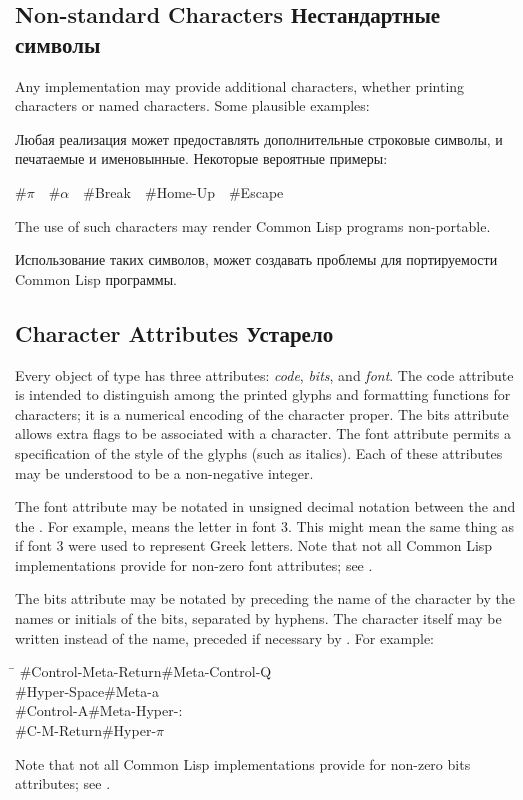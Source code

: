 \subsection{Non-standard Characters Нестандартные символы}

Any implementation may provide additional characters, whether printing
characters or named characters.  Some plausible examples:

Любая реализация может предоставлять дополнительные строковые символы, и
печатаемые и именовынные. Некоторые вероятные примеры:

\newpage%

\begin{lisp}
\#{\Xbackslash}$\pi$~~\#{\Xbackslash}$\alpha$~~\#{\Xbackslash}Break~~\#{\Xbackslash}Home-Up~~\#{\Xbackslash}Escape
\end{lisp}
The use of such characters may render Common Lisp programs non-portable.

Использование таких символов, может создавать проблемы для портируемости Common
Lisp программы.

\begin{obsolete}
\subsection{Character Attributes Устарело}
Every object of type 
has three attributes: \emph{code}, \emph{bits}, and \emph{font}.
The code attribute is intended to distinguish among the printed glyphs
and formatting functions for characters; it is a numerical encoding
of the character proper.
The bits attribute allows extra
flags to be associated with a character.  The font attribute permits
a specification of the style of the glyphs (such as italics).
Each of these attributes may be understood to be a non-negative integer.

The font attribute may be notated in unsigned decimal notation
between the \cd{\#} and the \cd{{\Xbackslash}}.  For example,
 means the letter  in font 3.
This might mean the same thing as \cd{\#{\Xbackslash}$\alpha$} if font 3
were used to represent Greek letters.
Note that not all Common Lisp implementations provide for non-zero
font attributes; see .

The bits attribute may be notated
by preceding the name of the character by the names or initials
of the bits,
separated by hyphens.  The character itself may be written
instead of the name, preceded if necessary by \cd{{\Xbackslash}}.  For example:
\begin{lisp}
\textwidth\=\kill
\#{\Xbackslash}Control-Meta-Return\>\#{\Xbackslash}Meta-Control-Q \\
\#{\Xbackslash}Hyper-Space\>\#{\Xbackslash}Meta-{\Xbackslash}a \\
\#{\Xbackslash}Control-A\>\#{\Xbackslash}Meta-Hyper-{\Xbackslash}: \\
\#{\Xbackslash}C-M-Return\>\#{\Xbackslash}Hyper-{\Xbackslash}$\pi$
\end{lisp}
Note that not all Common Lisp implementations provide for non-zero
bits attributes; see .
\end{obsolete}

